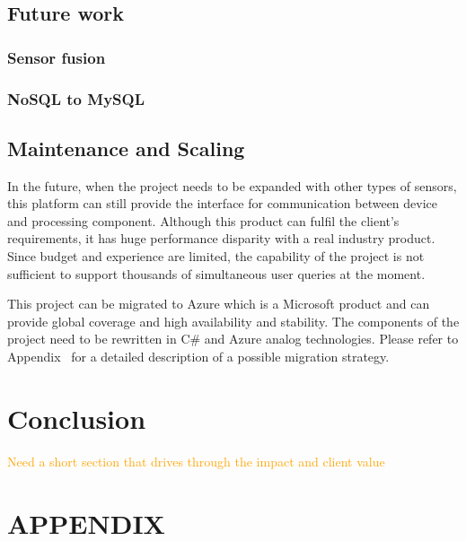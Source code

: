 \documentclass[prodmode,acmtosem]{acmsmall} %
\begin{document}
\subsection{Future work}

\subsubsection{Sensor fusion}

\subsubsection{NoSQL to MySQL}

\subsection{Maintenance and Scaling}
In the future, when the project needs to be expanded with other types of sensors, this platform can still provide the interface for communication between device and processing component. 
Although this product can fulfil the client's requirements, it has huge performance disparity with a real industry product. Since budget and experience are limited, the capability of the project is not sufficient to support thousands of simultaneous user queries at the moment.

This project can be migrated to Azure which is a Microsoft product and can provide global coverage and high availability and stability. The components of the project need to be rewritten in C\# and Azure analog technologies. Please refer to Appendix~\cite{app:MigrationPlan} for a detailed description of a possible migration strategy.


\section{Conclusion}
\textcolor{orange}{Need a short section that drives through the impact and client value}


\appendix
\section*{APPENDIX} \label{Appendix}
\setcounter{section}{1}
\end{document}
